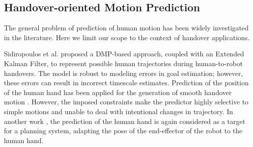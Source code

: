 \documentclass[lettersize,journal]{IEEEtran}
\begin{document}


\subsection{Handover-oriented Motion Prediction}
\noindent
The general problem of prediction of human motion has been widely investigated in the literature.
Here we limit our scope to the context of handover applications.

Sidiropoulos et al. \cite{sidiropoulos_human-robot_2021} proposed a DMP-based approach, coupled with an Extended Kalman Filter, to represent possible human trajectories during human-to-robot handovers.
The model is robust to modeling errors in goal estimation; however, these errors can result in incorrect timescale estimates.
Prediction of the position of the human hand has been applied for the generation of smooth handover motion \cite{sakata_robot-human_2017}. However, the imposed constraints make the predictor highly selective to simple motions and unable to deal with intentional changes in trajectory.
In another work \cite{melchiorre_vision-based_2021}, the prediction of the human hand is again considered as a target for a planning system, adapting the pose of the end-effector of the robot to the human hand.
\end{document}
